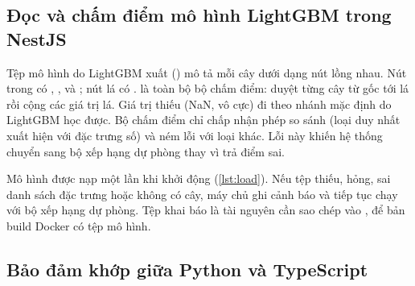 \subsection{Đọc và chấm điểm mô hình LightGBM trong NestJS}

Tệp mô hình do LightGBM xuất () mô tả mỗi cây dưới dạng nút lồng nhau. Nút trong có , ,  và ; nút lá có .  là toàn bộ bộ chấm điểm: duyệt từng cây từ gốc tới lá rồi cộng các giá trị lá. Giá trị thiếu (NaN, vô cực) đi theo nhánh mặc định do LightGBM học được. Bộ chấm điểm chỉ chấp nhận phép so sánh \code{<=} (loại duy nhất xuất hiện với đặc trưng số) và ném lỗi với loại khác. Lỗi này khiến hệ thống chuyển sang bộ xếp hạng dự phòng thay vì trả điểm sai.





Mô hình được nạp một lần khi khởi động (\cref{lst:load}). Nếu tệp thiếu, hỏng, sai danh sách đặc trưng hoặc không có cây, máy chủ ghi cảnh báo và tiếp tục chạy với bộ xếp hạng dự phòng. Tệp  khai báo  là tài nguyên cần sao chép vào , để bản build Docker có tệp mô hình.

\subsection{Bảo đảm khớp giữa Python và TypeScript}\label{sec:impl-parity}

